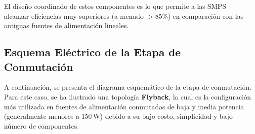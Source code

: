 \documentclass[12pt, a4paper]{article}
\begin{document}
El diseño coordinado de estos componentes es lo que permite a las SMPS alcanzar eficiencias muy superiores (a menudo $>85\%$) en comparación con las antiguas fuentes de alimentación lineales.

\subsection{Esquema Eléctrico de la Etapa de Conmutación}

A continuación, se presenta el diagrama esquemático de la etapa de conmutación. Para este caso, se ha ilustrado una topología \textbf{Flyback}, la cual es la configuración más utilizada en fuentes de alimentación conmutadas de baja y media potencia (generalmente menores a 150\,W) debido a su bajo costo, simplicidad y bajo número de componentes.
\end{document}
